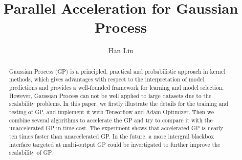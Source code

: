 \documentclass{article}
\title{Parallel Acceleration for Gaussian Process}
\author{Han Liu}
\begin{document}
\maketitle

\begin{abstract}
Gaussian Process (GP) is a principled, practical and probabilistic approach in kernel methods, which gives advantages with respect to the interpretation of model predictions and provides a well-founded framework for learning and model selection. However, Gaussian Process can not be well applied to large datasets due to the scalability problems. In this paper, we firstly illustrate the details for the training and testing of GP, and implement it with Tensorflow and Adam Optimizer. Then we combine several algorithms to accelerate the GP and try to compare it with the unaccelerated GP in time cost. The experiment shows that accelerated GP is nearly ten times faster than unaccelerated GP. In the future, a more intergral blackbox interface targeted at multi-output GP could be invertigated to further improve the scalability of GP.
\end{abstract}


\end{document}

